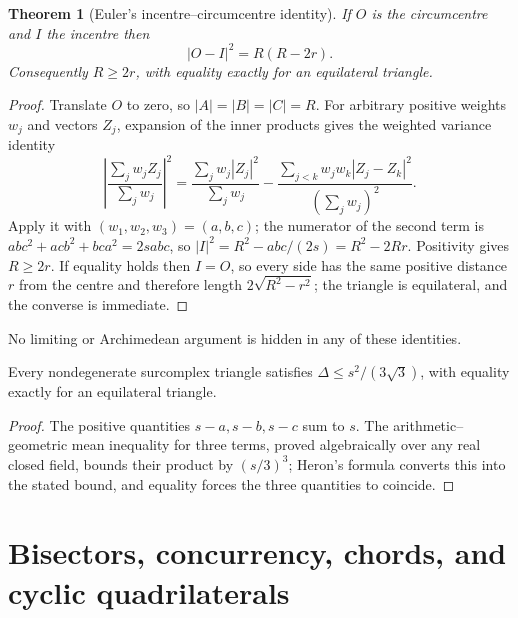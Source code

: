 \documentclass[11pt,letterpaper]{article}
\numberwithin{equation}{section}
\newtheorem{theorem}{Theorem}[section]
\theoremstyle{definition}
\theoremstyle{remark}
\begin{document}
\begin{theorem}[Euler's incentre--circumcentre identity]\label{trigonometry:thm:euler}
If $O$ is the circumcentre and $I$ the incentre then
\begin{equation}\label{trigonometry:eq:euler}
 |O-I|^2=R(R-2r).
\end{equation}
Consequently $R\ge2r$, with equality exactly for an equilateral triangle.
\end{theorem}
\begin{proof}
Translate $O$ to zero, so $|A|=|B|=|C|=R$. For arbitrary positive weights $w_j$ and vectors $Z_j$,
expansion of the inner products gives the weighted variance identity
\[
 \left|\frac{\sum_jw_jZ_j}{\sum_jw_j}\right|^2
 =\frac{\sum_jw_j|Z_j|^2}{\sum_jw_j}
 -\frac{\sum_{j<k}w_jw_k|Z_j-Z_k|^2}{(\sum_jw_j)^2}.
\]
Apply it with $(w_1,w_2,w_3)=(a,b,c)$; the numerator of the second term is
$abc^2+acb^2+bca^2=2sabc$, so $|I|^2=R^2-abc/(2s)=R^2-2Rr$. Positivity gives $R\ge2r$. If equality
holds then $I=O$, so every side has the same positive distance $r$ from the centre and therefore
length $2\sqrt{R^2-r^2}$; the triangle is equilateral, and the converse is immediate.
\end{proof}
No limiting or Archimedean argument is hidden in any of these identities.

\begin{corollary}\label{trigonometry:cor:areabound}
Every nondegenerate surcomplex triangle satisfies $\Delta\le s^2/(3\sqrt3)$, with equality exactly
for an equilateral triangle.
\end{corollary}
\begin{proof}
The positive quantities $s-a,s-b,s-c$ sum to $s$. The arithmetic--geometric mean inequality for
three terms, proved algebraically over any real closed field, bounds their product by $(s/3)^3$;
Heron's formula converts this into the stated bound, and equality forces the three quantities to
coincide.
\end{proof}

\section{Bisectors, concurrency, chords, and cyclic quadrilaterals}
\label{trigonometry:sec:incidence}
\end{document}
